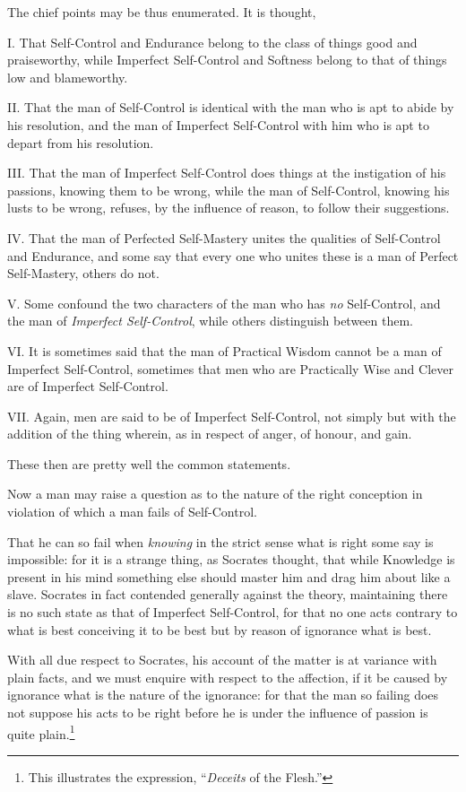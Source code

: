 The chief points may be thus enumerated. It is thought,

I. That Self-Control and Endurance belong to the class of things good and
praiseworthy, while Imperfect Self-Control and Softness belong to that of
things low and blameworthy.

II. That the man of Self-Control is identical with the man who is apt to abide
by his resolution, and the man of Imperfect Self-Control with him who is apt to
depart from his resolution.

III. That the man of Imperfect Self-Control does things at the instigation of
his passions, knowing them to be wrong, while the man of Self-Control, knowing
his lusts to be wrong, refuses, by the influence of reason, to follow their
suggestions.

IV. That the man of Perfected Self-Mastery unites the qualities of Self-Control
and Endurance, and some say that every one who unites these is a man of Perfect
Self-Mastery, others do not.

V. Some confound the two characters of the man who has \emph{no} Self-Control,
and the man of \emph{Imperfect Self-Control}, while others distinguish between
them.

VI. It is sometimes said that the man of Practical Wisdom cannot be a man of
Imperfect Self-Control, sometimes that men who are Practically Wise and Clever
are of Imperfect Self-Control.

VII. Again, men are said to be of Imperfect Self-Control, not simply but with
the addition of the thing wherein, as in respect of anger, of honour, and gain.

These then are pretty well the common statements.


Now a man may raise a question as to the nature of the right conception in
violation of which a man fails of Self-Control.

That he can so fail when \emph{knowing} in the strict sense what is right some
say is impossible: for it is a strange thing, as Socrates thought, that while
Knowledge is present in his mind something else should master him and drag him
about like a slave. Socrates in fact contended generally against the theory,
maintaining there is no such state as that of Imperfect Self-Control, for that
no one acts contrary to what is best conceiving it to be best but by reason of
ignorance what is best.

With all due respect to Socrates, his account of the matter is at variance with
plain facts, and we must enquire with respect to the affection, if it be caused
by ignorance what is the nature of the ignorance: for that the man so failing
does not suppose his acts to be right before he is under the influence of
passion is quite plain.\footnote{This illustrates the expression, “\emph{Deceits} of the Flesh.”}

